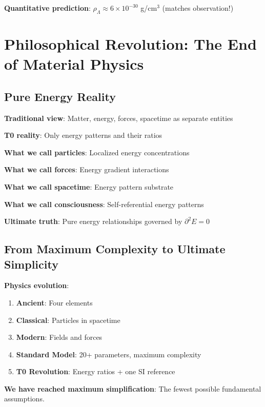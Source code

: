\documentclass[12pt,a4paper]{article}
\newcommand{\Efield}{E}
\theoremstyle{definition}
\theoremstyle{remark}
\begin{document}
	\textbf{Quantitative prediction}: $\rho_{\Lambda} \approx 6 \times 10^{-30}$ g/cm$^3$ (matches observation!)
	
	\section{Philosophical Revolution: The End of Material Physics}
	
	\subsection{Pure Energy Reality}
	
	\begin{tcolorbox}[colback=purple!5!white,colframe=purple!75!black,title=The Ultimate Dematerialization]
		\textbf{Traditional view}: Matter, energy, forces, spacetime as separate entities
		
		\textbf{T0 reality}: Only energy patterns and their ratios
		
		\textbf{What we call particles}: Localized energy concentrations
		
		\textbf{What we call forces}: Energy gradient interactions
		
		\textbf{What we call spacetime}: Energy pattern substrate
		
		\textbf{What we call consciousness}: Self-referential energy patterns
		
		\textbf{Ultimate truth}: Pure energy relationships governed by $\partial^2 \Efield = 0$
	\end{tcolorbox}
	
	\subsection{From Maximum Complexity to Ultimate Simplicity}
	
	\textbf{Physics evolution}:
	\begin{enumerate}
		\item \textbf{Ancient}: Four elements
		\item \textbf{Classical}: Particles in spacetime
		\item \textbf{Modern}: Fields and forces
		\item \textbf{Standard Model}: 20+ parameters, maximum complexity
		\item \textbf{T0 Revolution}: Energy ratios + one SI reference
		\end{enumerate}
		
		\textbf{We have reached maximum simplification}: The fewest possible fundamental assumptions.
		
\end{document}
